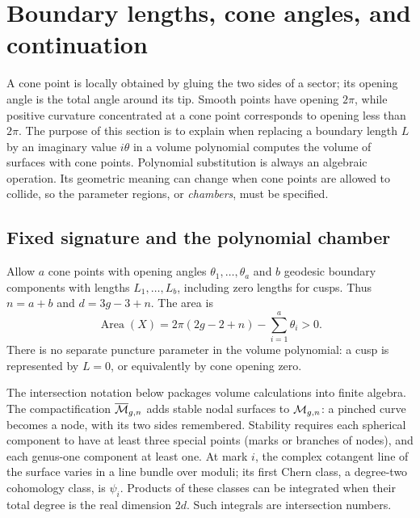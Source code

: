 \section{Boundary lengths, cone angles, and continuation}
\label{sec:cones}

A cone point is locally obtained by gluing the two sides of a sector;
its opening angle is the total angle around its tip. Smooth points
have opening $2\pi$, while positive curvature concentrated at a cone
point corresponds to opening less than $2\pi$. The purpose of this
section is to explain when replacing a boundary length $L$ by an
imaginary value $i\theta$ in a volume polynomial computes the volume
of surfaces with cone points. Polynomial substitution is always an
algebraic operation. Its geometric meaning can change when cone
points are allowed to collide, so the parameter regions, or
\emph{chambers}, must be specified.

\subsection{Fixed signature and the polynomial chamber}

Allow $a$ cone points with opening angles $\theta_1,\ldots,\theta_a$ and
$b$ geodesic boundary components with lengths $L_1,\ldots,L_b$, including
zero lengths for cusps. Thus $n=a+b$ and $d=3g-3+n$. The area is
\begin{equation}
 \operatorname{Area}(X)=2\pi(2g-2+n)-\sum_{i=1}^{a}\theta_i>0.
 \label{eq:gb}
\end{equation}
There is no separate puncture parameter in the volume polynomial: a cusp
is represented by $L=0$, or equivalently by cone opening zero.

The intersection notation below packages volume calculations into
finite algebra. The compactification $\overline{\mathcal M}_{g,n}$ adds stable nodal
surfaces to $\mathcal M_{g,n}$: a pinched curve becomes a node, with its two
sides remembered. Stability requires each spherical component to
have at least three special points (marks or branches of nodes),
and each genus-one component at least one. At mark $i$, the complex
cotangent line of the surface varies in a line bundle over moduli;
its first Chern class, a degree-two cohomology class, is $\psi_i$.
Products of these classes can be integrated when their total degree
is the real dimension $2d$. Such integrals are intersection numbers.

